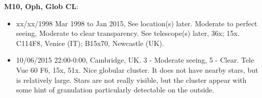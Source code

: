 {\bf M10, Oph, Glob CL}:
\begin{itemize}
\item xx/xx/1998 Mar 1998 to Jan 2015, See location(s) later. Moderate to perfect seeing, Moderate to clear transparency. See telescope(s) later, 36x; 15x. C114F8, Venice (IT); B15x70, Newcastle (UK).
\item 10/06/2015 22:00-0:00, Cambridge, UK. 3 - Moderate seeing, 5 - Clear. Tele Vue 60 F6, 15x, 51x. Nice globular cluster. It does not have nearby stars, but is relatively large. Stars are not really visible, but the cluster appear with some hint of granulation particularly detectable on the outside.
\end{itemize}

